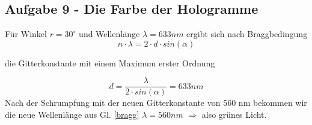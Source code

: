 \subsection*{Aufgabe 9 - Die Farbe der Hologramme}
Für Winkel $r = 30^{\circ}$ und Wellenlänge $\lambda = 633 nm$ ergibt sich nach Braggbedingung 
\begin{equation}
\label{bragg}
	n \cdot \lambda = 2 \cdot d\cdot sin \left( \alpha \right)
\end{equation}

die Gitterkonstante mit einem Maximum erster Ordnung

\begin{equation}
	d = \frac{\lambda}{2 \cdot sin \left(\alpha \right)} = 633 nm
\end{equation} 
Nach der Schrumpfung mit der neuen Gitterkonstante von 560 nm bekommen wir die neue Wellenlänge aus Gl. \eqref{bragg} $\lambda = 560 nm$ $\Rightarrow$ also grünes Licht.